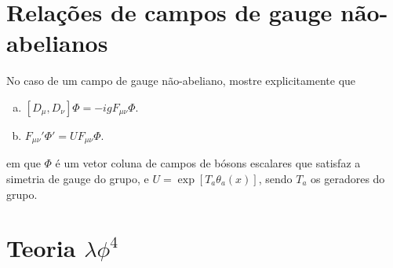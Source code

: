 \documentclass[a4paper, 11pt, oneside]{impression}
\begin{document}


\chapter{Relações de campos de gauge não-abelianos}\label{quest: three}

\begin{exercise}{}
    No caso de um campo de gauge não-abeliano, mostre explicitamente que
    \begin{enumerate}[(a)]
        \item $[D_{\mu}, D_{\nu}]\Phi = -igF_{\mu\nu}\Phi$.
        \item $F_{\mu\nu}' \Phi' = UF_{\mu\nu}\Phi$.
    \end{enumerate}
    em que $\Phi$ é um vetor coluna de campos de bósons escalares que satisfaz a simetria de gauge do grupo, e $U = \exp[T_{a}\theta_{a}(x)]$, sendo $T_{a}$ os geradores do grupo.
\end{exercise}



\chapter{Teoria \texorpdfstring{$\lambda\phi^{4}$}{}}\label{quest: four}
\end{document}

